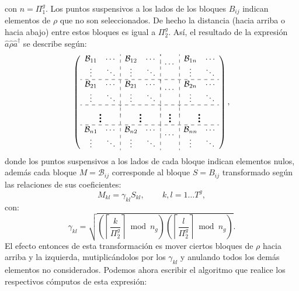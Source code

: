con $n=\Pi_1^g$. Los puntos suspensivos a los lados de los bloques $B_{ij}$ indican elementos de $\rho$ que no son seleccionados. De hecho la distancia (hacia arriba o hacia abajo) entre estos bloques es igual a $\Pi_2^g$. As\'i, el resultado de la expresi\'on $\hat{a}\hat{\rho}\hat{a}^{\dag}$ se describe seg\'un:\\\begin{equation}\left(
 \begin{array}{cc:cc:cc:cc}
\mathcal{B}_{11} & \cdots & \mathcal{B}_{12} & \cdots & \multicolumn{2}{:c:}{\multirow{2}{*}{$\cdots$} } & \mathcal{B}_{1n}&\cdots \\
\vdots & \ddots & \vdots & \ddots & & & \vdots & \ddots \\\hdashline
\mathcal{B}_{21} & \cdots & \mathcal{B}_{21} & \cdots & \multicolumn{2}{:c:}{\multirow{2}{*}{$\cdots$} } & \mathcal{B}_{2n}&\cdots \\
\vdots & \ddots & \vdots & \ddots & & & \vdots & \ddots \\\hdashline
\multicolumn{2}{c:}{\multirow{2}{*}{\Huge$\vdots$} } & \multicolumn{2}{:c:}{\multirow{2}{*}{\Huge$\vdots$} } & \multicolumn{2}{:c:}{\multirow{2}{*}{\Huge$\vdots$} }&\multicolumn{2}{:c}{\multirow{2}{*}{\Huge$\vdots$} }\\
&&&&&&& \\\hdashline

\mathcal{B}_{n1} & \cdots & \mathcal{B}_{n2} & \cdots & \multicolumn{2}{:c:}{\multirow{2}{*}{$\cdots$} } & \mathcal{B}_{nn}&\cdots \\
\vdots & \ddots & \vdots & \ddots & & & \vdots & \ddots
\end{array}\right),
\end{equation}
donde los puntos suspensivos a los lados de cada bloque indican elementos nulos, adem\'as cada bloque $M=\mathcal{B}_{ij}$ corresponde al bloque $S=B_{ij}$ transformado seg\'un las relaciones de sus coeficientes:
$$M_{kl}=\gamma_{kl}S_{kl},\,\qquad k,l=1\ldots T^g,$$
con:\begin{equation}
 \gamma_{kl}=\sqrt{ \left(\left\lceil \frac{k}{\Pi_2^g} \right\rceil\bmod n_g\right)\left(\left\lceil \frac{l}{\Pi_2^g} \right\rceil\bmod n_g \right) }.\label{ec:coef_gammas}
\end{equation}
\quad El efecto entonces de esta transformaci\'on es mover ciertos bloques de $\rho$ hacia arriba y la izquierda, mutiplic\'andolos por los $\gamma_{kl}$ y anulando todos los dem\'as elementos no considerados. Podemos ahora escribir el algoritmo que realice los respectivos c\'omputos de esta expresi\'on:

